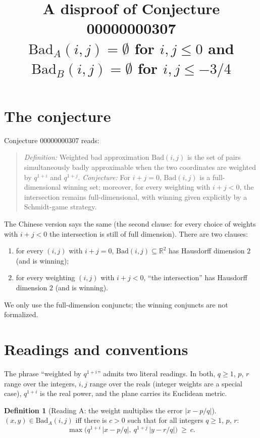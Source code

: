 \documentclass[11pt]{article}
\title{A disproof of Conjecture 00000000307\\[2pt]
\large $\mathrm{Bad}_A(i,j)=\emptyset$ for $i,j\le 0$ and $\mathrm{Bad}_B(i,j)=\emptyset$ for $i,j\le -3/4$}
\date{}
\theoremstyle{definition}
\newtheorem{definition}[theorem]{Definition}
\theoremstyle{remark}
\renewcommand{\_}{\oldus\allowbreak}
\newcommand{\BadA}{\mathrm{Bad}_A}
\begin{document}
\sloppy
\maketitle

\section{The conjecture}

Conjecture 00000000307 reads:
\begin{quote}
\emph{Definition:} Weighted bad approximation $\mathrm{Bad}(i,j)$ is the set of pairs simultaneously badly
approximable when the two coordinates are weighted by $q^{1+i}$ and $q^{1+j}$.
\emph{Conjecture:} For $i+j=0$, $\mathrm{Bad}(i,j)$ is a full-dimensional winning set; moreover, for every
weighting with $i+j<0$, the intersection remains full-dimensional, with winning given explicitly by a
Schmidt-game strategy.
\end{quote}
The Chinese version says the same (the second clause: for every choice of weights with $i+j<0$ the
intersection is still of full dimension).  There are two clauses:
\begin{enumerate}[label=(\Roman*)]
  \item for every $(i,j)$ with $i+j=0$, $\mathrm{Bad}(i,j)\subseteq\mathbb{R}^2$ has Hausdorff dimension $2$
        (and is winning);
  \item for every weighting $(i,j)$ with $i+j<0$, ``the intersection'' has Hausdorff dimension $2$ (and is
        winning).
\end{enumerate}
We only use the full-dimension conjuncts; the winning conjuncts are not formalized.

\section{Readings and conventions}

The phrase ``weighted by $q^{1+i}$'' admits two literal readings. In both, $q\ge 1$, $p$, $r$ range over
the integers, $i,j$ range over the reals (integer weights are a special case), $q^{1+i}$ is the real power,
and the plane carries its Euclidean metric.

\begin{definition}[Reading A: the weight multiplies the error $|x-p/q|$]
$(x,y)\in\BadA(i,j)$ iff there is $c>0$ such that for all integers $q\ge 1$, $p$, $r$:
\[ \max\bigl(q^{1+i}\,|x-p/q|,\ q^{1+j}\,|y-r/q|\bigr)\ \ge\ c. \]
\end{definition}
\end{document}
